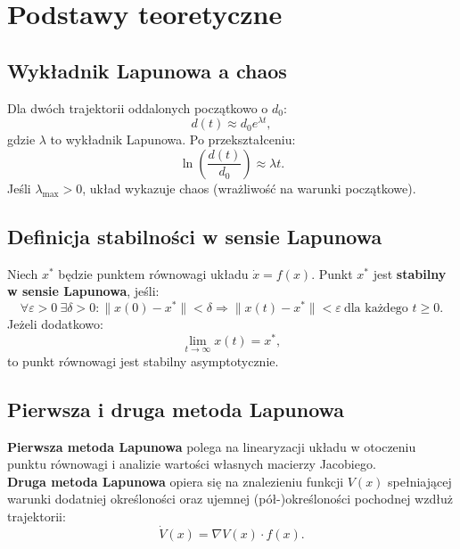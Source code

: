 \documentclass[12pt,a4paper]{article}
\begin{document}
\section{Podstawy teoretyczne}

\subsection{Wyk\l{}adnik Lapunowa a chaos}
Dla dw\'och trajektorii oddalonych pocz\k{a}tkowo o $d_0$:
\begin{equation}
    d(t) \approx d_0 e^{\lambda t},
\end{equation}
gdzie $\lambda$ to wyk\l{}adnik Lapunowa. Po przekszta\l{}ceniu:
\begin{equation}
    \ln\left(\frac{d(t)}{d_0}\right) \approx \lambda t.
\end{equation}
Je\'sli $\lambda_{\max} > 0$, uk\l{}ad wykazuje chaos (wra\.zliwo\'s\'c na warunki pocz\k{a}tkowe).

\subsection{Definicja stabilno\'sci w sensie Lapunowa}
Niech $x^\ast$ b\k{e}dzie punktem r\'ownowagi uk\l{}adu $\dot{x}=f(x)$.
Punkt $x^\ast$ jest \textbf{stabilny w sensie Lapunowa}, je\'sli:
\begin{equation}
    \forall \varepsilon > 0 \ \exists \delta > 0:
    \|x(0)-x^\ast\| < \delta \Rightarrow \|x(t)-x^\ast\| < \varepsilon \ \text{dla ka\.zdego } t \ge 0.
\end{equation}
Je\.zeli dodatkowo:
\begin{equation}
    \lim_{t\to\infty}x(t)=x^\ast,
\end{equation}
to punkt r\'ownowagi jest stabilny asymptotycznie.

\subsection{Pierwsza i druga metoda Lapunowa}
\textbf{Pierwsza metoda Lapunowa} polega na linearyzacji uk\l{}adu w otoczeniu punktu r\'ownowagi i analizie warto\'sci w\l{}asnych macierzy Jacobiego.\\
\textbf{Druga metoda Lapunowa} opiera si\k{e} na znalezieniu funkcji $V(x)$ spe\l{}niaj\k{a}cej warunki dodatniej okre\'slono\'sci oraz ujemnej (p\'o\l{}-)okre\'slono\'sci pochodnej wzd\l{}u\.z trajektorii:
\begin{equation}
    \dot{V}(x)=\nabla V(x)\cdot f(x).
\end{equation}
\end{document}
